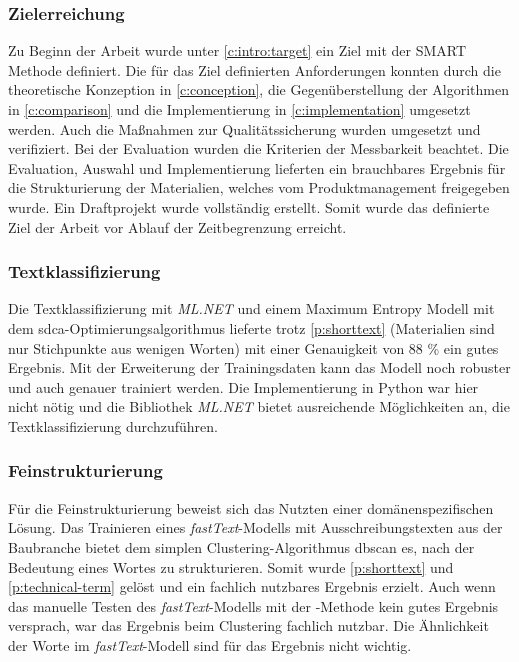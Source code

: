 \subsubsection{Zielerreichung}
Zu Beginn der Arbeit wurde unter \autoref{c:intro:target} ein Ziel mit der SMART Methode definiert. Die für das Ziel definierten Anforderungen konnten durch die theoretische Konzeption in \autoref{c:conception}, die Gegenüberstellung der Algorithmen in \autoref{c:comparison} und die Implementierung in \autoref{c:implementation} umgesetzt werden. Auch die Maßnahmen zur Qualitätssicherung wurden umgesetzt und verifiziert. Bei der Evaluation wurden die Kriterien der Messbarkeit beachtet. Die Evaluation, Auswahl und Implementierung lieferten ein brauchbares Ergebnis für die Strukturierung der Materialien, welches vom Produktmanagement freigegeben wurde. Ein Draftprojekt wurde vollständig erstellt. Somit wurde das definierte Ziel der Arbeit vor Ablauf der Zeitbegrenzung erreicht.

\subsubsection{Textklassifizierung}
Die Textklassifizierung mit \textit{ML.NET} und einem Maximum Entropy Modell mit dem \ac{sdca}-Optimierungsalgorithmus lieferte trotz \autoref{p:shorttext} (Materialien sind nur Stichpunkte aus wenigen Worten) mit einer Genauigkeit von 88 \% ein gutes Ergebnis. Mit der Erweiterung der Trainingsdaten kann das Modell noch robuster und auch genauer trainiert werden. Die Implementierung in Python war hier nicht nötig und die Bibliothek \textit{ML.NET} bietet ausreichende Möglichkeiten an, die Textklassifizierung durchzuführen.

\subsubsection{Feinstrukturierung}
Für die Feinstrukturierung beweist sich das Nutzten einer domänenspezifischen Lösung. Das Trainieren eines \textit{fastText}-Modells mit Ausschreibungstexten aus der Baubranche bietet dem simplen Clustering-Algorithmus \ac{dbscan} es, nach der Bedeutung eines Wortes zu strukturieren. Somit wurde \autoref{p:shorttext} und \autoref{p:technical-term} gelöst und ein fachlich nutzbares Ergebnis erzielt. Auch wenn das manuelle Testen des \textit{fastText}-Modells mit der -Methode kein gutes Ergebnis versprach, war das Ergebnis beim Clustering fachlich nutzbar. Die Ähnlichkeit der Worte im \textit{fastText}-Modell sind für das Ergebnis nicht wichtig.

